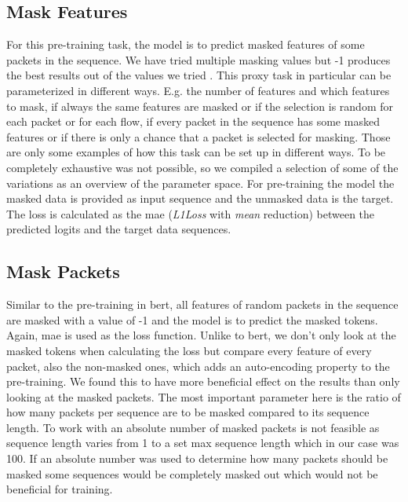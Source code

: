 \subsection{Mask Features} \label{sec:experiments_lstm_mask_feature}

For this pre-training task, the model is to predict masked features of some packets in the sequence. We have tried multiple masking values but -1 produces the best results out of the values we tried . This proxy task in particular can be parameterized in different ways. E.g. the number of features and which features to mask, if always the same features are masked or if the selection is random for each packet or for each flow, if every packet in the sequence has some masked features or if there is only a chance that a packet is selected for masking. Those are only some examples of how this task can be set up in different ways. To be completely exhaustive was not possible, so we compiled a selection of some of the variations as an overview of the parameter space. For pre-training the model the masked data is provided as input sequence and the unmasked data is the target. The loss is calculated as the \gls{mae} (\textit{L1Loss} with \textit{mean} reduction) between the predicted logits and the target data sequences. 

\subsection{Mask Packets} \label{sec:experiments_lstm_mask_packet}

Similar to the pre-training in \gls{bert}, all features of random packets in the sequence are masked with a value of -1 and the model is to predict the masked tokens. Again, \gls{mae} is used as the loss function. Unlike to \gls{bert}, we don't only look at the masked tokens when calculating the loss but compare every feature of every packet, also the non-masked ones, which adds an auto-encoding property to the pre-training. We found this to have more beneficial effect on the results than only looking at the masked packets. The most important parameter here is the ratio of how many packets per sequence are to be masked compared to its sequence length. To work with an absolute number of masked packets is not feasible as sequence length varies from 1 to a set max sequence length which in our case was 100. If an absolute number was used to determine how many packets should be masked some sequences would be completely masked out which would not be beneficial for training.

